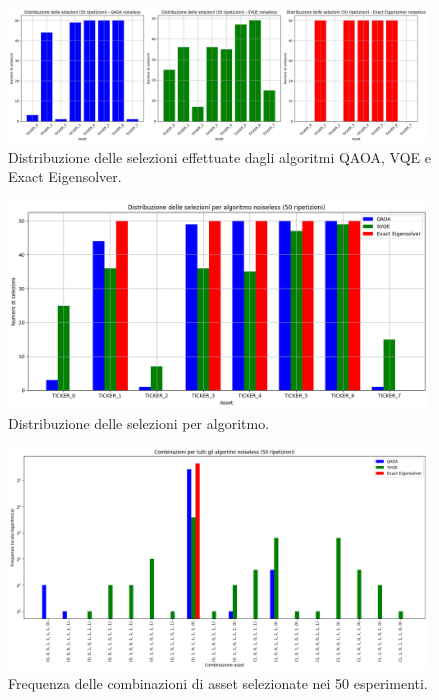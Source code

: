 \begin{figure}[ht!]
    \centering
    \includegraphics[width=0.99\textwidth]{images/risultati/noiseless-risultati-1.png}
    \caption{Distribuzione delle selezioni effettuate dagli algoritmi QAOA, VQE e Exact Eigensolver.}
    \label{fig:noiseless-risultati-1}
\end{figure}
\begin{figure}[ht!]
    \centering
    \includegraphics[width=0.99\textwidth]{images/risultati/noiseless-risultati-2.png}
    \caption{Distribuzione delle selezioni per algoritmo.}
    \label{fig:noiseless-risultati-2}
\end{figure}
\begin{figure}[ht!]
    \centering
    \includegraphics[width=0.99\textwidth]{images/risultati/noiseless-risultati-3.png}
    \caption{Frequenza delle combinazioni di asset selezionate nei 50 esperimenti.}
    \label{fig:noiseless-risultati-3}
\end{figure}


